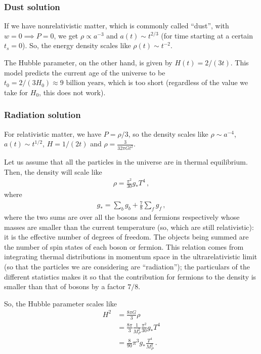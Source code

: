 \documentclass[main.tex]{subfiles}
\begin{document}
\subsubsection{Dust solution}

If we have nonrelativistic matter, which is commonly called ``dust'', with \(w = 0 \implies P = 0\), we get \(\rho \propto a^{-3}\) and \(a(t) \sim t^{2/3}\) (for time starting at a certain \(t_s = 0\)).
So, the energy density scales like \(\rho (t) \sim t^{-2}\). 

The Hubble parameter, on the other hand, is given by \(H(t) = 2 / (3 t)\). 
This model predicts the current age of the universe to be \(t_0 = 2/ (3 H_0 ) \approx 9 \text{ billion years}\), which is too short (regardless of the value we take for \(H_0 \), this does not work).

\subsubsection{Radiation solution}

For relativistic matter, we have \(P = \rho /3\), so the density scales like \(\rho \sim a^{-4}\), \(a(t) \sim t^{1/2}\), \(H = 1/(2t)\) and \(\rho = \frac{3}{32 \pi G t^2} \).

Let us assume that all the particles in the universe are in thermal equilibrium. 
Then, the density will scale like 
%
\begin{align}
\rho = \frac{\pi^2}{30} g_{*} T^{4}
\,,
\end{align}
%
where 
%
\begin{align}
g_{*} = \sum _{b} g_b + \frac{7}{8} \sum _{f} g_f
\,,
\end{align}
%
where the two sums are over all the bosons and fermions respectively whose masses are smaller than the current temperature (so, which are still relativistic): it is the effective number of degrees of freedom.
The objects being summed are the number of spin states of each boson or fermion.
This relation comes from integrating thermal distributions in momentum space in the ultrarelativistic limit (so that the particles we are considering are ``radiation''); the particulars of the different statistics makes it so that the contribution for fermions to the density is smaller than that of bosons by a factor \(7/8\).

So, the Hubble parameter scales like 
%
\begin{align}
H^2 &= \frac{8\pi G}{3} \rho   \\
&= \frac{8 \pi }{3} \frac{1}{M_P^2} \frac{\pi^2 }{30} g_{*} T^{4}  \\
&= \frac{8}{90} \pi^3 g_{*} \frac{T^{4}}{M_P^2}
\,.
\end{align}
\end{document}
